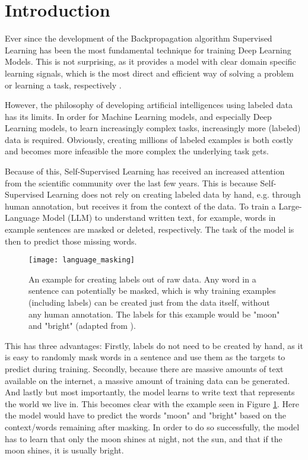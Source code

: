 \section{Introduction}
Ever since the development of the Backpropagation
algorithm Supervised Learning has been the most fundamental technique for
training Deep Learning Models. This is not surprising, as it provides a model with clear domain specific
learning signals, which is the most direct and efficient way of solving a problem
or learning a task, respectively \cite{geron}.

However, the philosophy of developing artificial intelligences using labeled
data has its limits. In order for Machine Learning models, and especially Deep Learning models, 
to learn increasingly complex tasks, increasingly more (labeled) data is required.
Obviously, creating millions of labeled examples is both costly and becomes more infeasible
the more complex the underlying task gets.

Because of this, Self-Supervised Learning has received an increased attention from the scientific
community over the last few years. This is because Self-Supervised Learning does not
rely on creating labeled data by hand, e.g. through human annotation, but receives it
from the context of the data. To train a Large-Language Model (LLM) to understand 
written text, for example, words in example sentences are masked or
deleted, respectively. The task of the model is then to predict those missing words.


\begin{figure}[htbp]
	\texttt{[image: language\_masking]}
	\centering
    \label{language_masking}
	\caption{An example for creating labels out of raw data. Any word in a sentence can
    potentially be masked, which is why training examples (including labels) can be created
    just from the data itself, without any human annotation. The labels for this example would
    be "moon" and "bright" (adapted from \cite{lecun}).}
\end{figure}

This has three advantages: Firstly, labels do not need to be created by hand, as it is easy
to randomly mask words in a sentence and use them as the targets to predict during training.
Secondly, because there are massive amounts of text available on the internet, a massive amount of training
data can be generated.
And lastly but most importantly, the model learns to write text that represents the world we live in.
This becomes clear with the example seen in Figure \ref{language_masking}.
Here the model would have to predict the words "moon" and "bright" based on the context/words
remaining after masking. In order to do so successfully, the model has to learn that only the moon shines at night, not the
sun, and that if the moon shines, it is usually bright.

